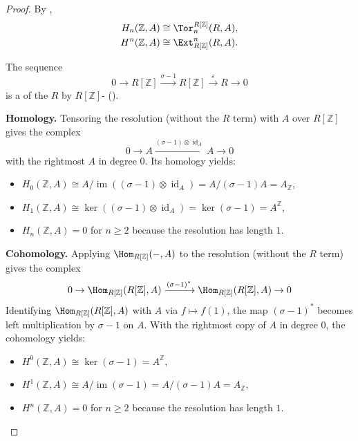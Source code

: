 \begin{proof}
    By ,
    \begin{align*}
        H_n(\mathbb{Z}, A) &\cong \Tor_n^{R[\mathbb{Z}]}(R, A), \\
        H^n(\mathbb{Z}, A) &\cong \Ext^n_{R[\mathbb{Z}]}(R, A).
    \end{align*}

    The sequence
    $$0 \to R[\mathbb{Z}] \xrightarrow{\sigma-1} R[\mathbb{Z}] \xrightarrow{\varepsilon} R \to 0$$
    is a  of the  $R$ by  $R[\mathbb{Z}]$- ().

    \textbf{Homology.} Tensoring the resolution (without the $R$ term) with $A$ over $R[\mathbb{Z}]$ gives the complex
    $$0 \to A \xrightarrow{(\sigma-1)\otimes \operatorname{id}_A} A \to 0$$
    with the rightmost $A$ in degree $0$. Its homology yields:
    \begin{itemize}
        \item $H_0(\mathbb{Z}, A) \cong A/\operatorname{im}((\sigma-1)\otimes \operatorname{id}_A) = A/(\sigma-1)A = A_{\mathbb{Z}}$,
        \item $H_1(\mathbb{Z}, A) \cong \ker((\sigma-1)\otimes \operatorname{id}_A) = \ker(\sigma-1) = A^{\mathbb{Z}}$,
        \item $H_n(\mathbb{Z}, A) = 0$ for $n \geq 2$ because the resolution has length $1$.
    \end{itemize}

    \textbf{Cohomology.} Applying $\Hom_{R[\mathbb{Z}]}(-, A)$ to the resolution (without the $R$ term) gives the complex
    $$0 \to \Hom_{R[\mathbb{Z}]}(R[\mathbb{Z}], A) \xrightarrow{(\sigma-1)^*} \Hom_{R[\mathbb{Z}]}(R[\mathbb{Z}], A) \to 0$$
    Identifying $\Hom_{R[\mathbb{Z}]}(R[\mathbb{Z}], A)$ with $A$ via $f \mapsto f(1)$, the map $(\sigma-1)^*$ becomes left multiplication by $\sigma-1$ on $A$. With the rightmost copy of $A$ in degree $0$, the cohomology yields:
    \begin{itemize}
        \item $H^0(\mathbb{Z}, A) \cong \ker(\sigma-1) = A^{\mathbb{Z}}$,
        \item $H^1(\mathbb{Z}, A) \cong A/\operatorname{im}(\sigma-1) = A/(\sigma-1)A = A_{\mathbb{Z}}$,
        \item $H^n(\mathbb{Z}, A) = 0$ for $n \geq 2$ because the resolution has length $1$.
    \end{itemize}
\end{proof}
